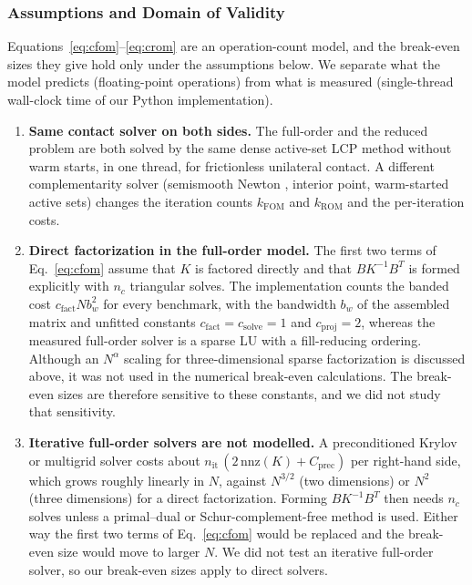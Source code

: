 \documentclass[11pt,a4paper]{article}
\providecommand{\tightlist}{\setlength{\itemsep}{0pt}\setlength{\parskip}{0pt}}
\begin{document}
\hypertarget{cost-model-assumptions}{%
\subsubsection{Assumptions and Domain of Validity}\label{cost-model-assumptions}}

Equations~\eqref{eq:cfom}--\eqref{eq:crom} are an operation-count model, and the break-even sizes they give hold only under the assumptions below. We separate what the model predicts (floating-point operations) from what is measured (single-thread wall-clock time of our Python implementation).

\begin{enumerate}
\tightlist
\item \textbf{Same contact solver on both sides.} The full-order and the reduced problem are both solved by the same dense active-set LCP method without warm starts, in one thread, for frictionless unilateral contact. A different complementarity solver (semismooth Newton \cite{hintermuller2002primal}, interior point, warm-started active sets) changes the iteration counts $k_{\mathrm{FOM}}$ and $k_{\mathrm{ROM}}$ and the per-iteration costs.
\item \textbf{Direct factorization in the full-order model.} The first two terms of Eq.~\eqref{eq:cfom} assume that $K$ is factored directly and that $B K^{-1} B^T$ is formed explicitly with $n_c$ triangular solves. The implementation counts the banded cost $c_{\mathrm{fact}} N b_w^2$ for every benchmark, with the bandwidth $b_w$ of the assembled matrix and unfitted constants $c_{\mathrm{fact}} = c_{\mathrm{solve}} = 1$ and $c_{\mathrm{proj}} = 2$, whereas the measured full-order solver is a sparse LU with a fill-reducing ordering. Although an $N^\alpha$ scaling for three-dimensional sparse factorization is discussed above, it was not used in the numerical break-even calculations. The break-even sizes are therefore sensitive to these constants, and we did not study that sensitivity.
\item \textbf{Iterative full-order solvers are not modelled.} A preconditioned Krylov or multigrid solver \cite{kornhuber2001adaptive, wohlmuth2003monotone} costs about $n_{\mathrm{it}}\,(2\,\mathrm{nnz}(K) + C_{\mathrm{prec}})$ per right-hand side, which grows roughly linearly in $N$, against $N^{3/2}$ (two dimensions) or $N^{2}$ (three dimensions) for a direct factorization. Forming $B K^{-1} B^T$ then needs $n_c$ solves unless a primal--dual or Schur-complement-free method is used. Either way the first two terms of Eq.~\eqref{eq:cfom} would be replaced and the break-even size would move to larger $N$. We did not test an iterative full-order solver, so our break-even sizes apply to direct solvers.

\end{enumerate}
\end{document}
